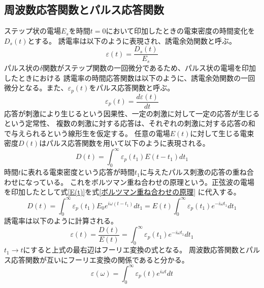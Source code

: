 \documentclass[dvipdfmx,12pt,a4paper]{jreport}
\begin{document}
			\subsection{周波数応答関数とパルス応答関数}
			ステップ状の電場$E_s$を時間$t=0$において印加したときの電束密度の時間変化を$D_s(t)$とする。
			誘電率は以下のように表現され、誘電余効関数と呼ぶ。
			\begin{equation}
				\varepsilon(t)=\frac{D_s(t)}{E_s}
			\end{equation}
			パルス状の$\delta$関数がステップ関数の一回微分であるため、パルス状の電場を印加したときにおける
			誘電率の時間応答関数は以下のように、誘電余効関数の一回微分となる。また、$\varepsilon_p(t)$をパルス応答関数と呼ぶ。
			\begin{equation}
				\varepsilon_p(t)=\frac{d\varepsilon(t)}{dt}
				\label{パルス応答関数}
			\end{equation}
			応答が刺激により生じるという因果性、一定の刺激に対して一定の応答が生じるという定常性、
			複数の刺激に対する応答は、それぞれの刺激に対する応答の和で与えられるという線形生を仮定する。
			任意の電場$E(t)$に対して生じる電束密度$D(t)$はパルス応答関数を用いて以下のように表現される。
			\begin{equation}
				D(t)=\int^{\infty}_0 \varepsilon_p(t_1)E(t-t_1) dt_1
				\label{ボルツマン重ね合わせの原理}
			\end{equation}
			時間$t$に表れる電束密度という応答が時間$t_1$に与えたパルス刺激の応答の重ね合わせになっている。
			これをボルツマン重ね合わせの原理という。正弦波の電場を印加したとして式\eqref{E(t)}を式\eqref{ボルツマン重ね合わせの原理}
			に代入する。
			\begin{equation}
				D(t)=\int^{\infty}_0 \varepsilon_p(t_1)E_0e^{i\omega(t-t_1)}dt_1=E(t)\int^{\infty}_0 \varepsilon_p(t_1)e^{-i\omega t_1}dt_1
			\end{equation}
			誘電率は以下のように計算される。
			\begin{equation}
				\varepsilon(t)=\frac{D(t)}{E(t)}=\int^{\infty}_0 \varepsilon_p(t_1)e^{-i\omega t_1} dt_1
			\end{equation}
			$t_1\rightarrow t$にすると上式の最右辺はフーリエ変換の式となる。
			周波数応答関数とパルス応答関数が互いにフーリエ変換の関係であると分かる。
			\begin{equation}
				\varepsilon(\omega)=\int^{\infty}_0 \varepsilon_p(t)e^{i\omega t}dt
				\label{周波数応答関数とパルス応答関数のフーリエ変換}
			\end{equation}
\end{document}

